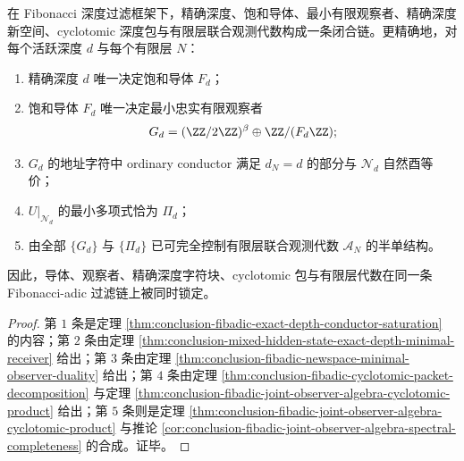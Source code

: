 \begin{theorem}\label{thm:conclusion-fibadic-saturated-observer-closure}
在 Fibonacci 深度过滤框架下，精确深度、饱和导体、最小有限观察者、精确深度新空间、cyclotomic 深度包与有限层联合观测代数构成一条闭合链。更精确地，对每个活跃深度 \(d\) 与每个有限层 \(N\)：
\begin{enumerate}
  \item 精确深度 \(d\) 唯一决定饱和导体 \(F_d\)；
  \item 饱和导体 \(F_d\) 唯一决定最小忠实有限观察者
  \[
  G_d=(\ZZ/2\ZZ)^\beta\oplus \ZZ/(F_d\ZZ);
  \]
  \item \(G_d\) 的地址字符中 ordinary conductor 满足 \(d_N=d\) 的部分与 \(\mathcal N_d\) 自然酉等价；
  \item \(U|_{\mathcal N_d}\) 的最小多项式恰为 \(\Pi_d\)；
  \item 由全部 \(\{G_d\}\) 与 \(\{\Pi_d\}\) 已可完全控制有限层联合观测代数 \(\mathscr A_N\) 的半单结构。
\end{enumerate}
因此，导体、观察者、精确深度字符块、cyclotomic 包与有限层代数在同一条 Fibonacci-adic 过滤链上被同时锁定。
\end{theorem}
\begin{proof}
第 \(1\) 条是定理 \ref{thm:conclusion-fibadic-exact-depth-conductor-saturation} 的内容；第 \(2\) 条由定理 \ref{thm:conclusion-mixed-hidden-state-exact-depth-minimal-receiver} 给出；第 \(3\) 条由定理 \ref{thm:conclusion-fibadic-newspace-minimal-observer-duality} 给出；第 \(4\) 条由定理 \ref{thm:conclusion-fibadic-cyclotomic-packet-decomposition} 与定理 \ref{thm:conclusion-fibadic-joint-observer-algebra-cyclotomic-product} 给出；第 \(5\) 条则是定理 \ref{thm:conclusion-fibadic-joint-observer-algebra-cyclotomic-product} 与推论 \ref{cor:conclusion-fibadic-joint-observer-algebra-spectral-completeness} 的合成。证毕。
\end{proof}

\endinput
